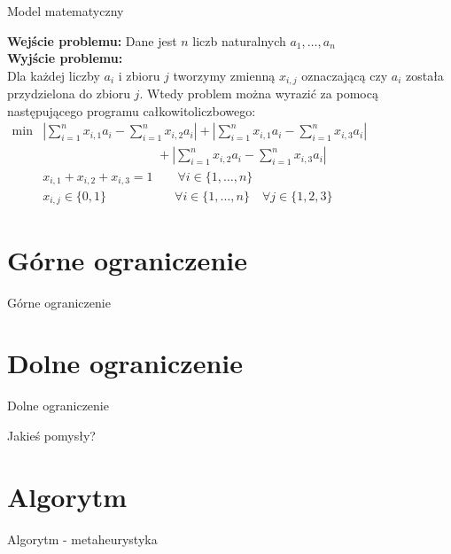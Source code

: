 \documentclass{beamer}
\begin{document}
\begin{frame}[t]{Model matematyczny}

\textbf{Wejście problemu:} Dane jest $n$ liczb naturalnych $a_1,\dots,a_n$
\\[0.1in]\textbf{Wyjście problemu:}\\ Dla każdej liczby $a_i$ i zbioru $j$ tworzymy zmienną $x_{i,j}$ oznaczającą czy $a_i$ została przydzielona do zbioru $j$. Wtedy problem można wyrazić za pomocą następującego programu całkowitoliczbowego:
\begin{equation*}
\begin{aligned}
\min &\left| \sum_{i=1}^n x_{i,1} a_i - \sum_{i=1}^n x_{i,2} a_i \right| + \left| \sum_{i=1}^n x_{i,1} a_i - \sum_{i=1}^n x_{i,3} a_i\right| \\
&\qquad\qquad\qquad\qquad\quad\:+ \left| \sum_{i=1}^n x_{i,2} a_i - \sum_{i=1}^n x_{i,3} a_i\right| \\
& x_{i,1} + x_{i,2} + x_{i,3} = 1 \quad\quad \forall i\in \{1,\dots,n\} \\
& x_{i,j} \in \{0,1\} \,\,\,\quad\qquad\qquad \forall i\in \{1,\dots,n\}\quad \forall j\in \{1,2,3\}
\end{aligned}
\phantom{\hspace{6cm}}
\end{equation*}

\end{frame}

\section{Górne ograniczenie}

\begin{frame}{Górne ograniczenie}


\end{frame}

\section{Dolne ograniczenie}

\begin{frame}{Dolne ograniczenie}

Jakieś pomysły?

\end{frame}

\section{Algorytm}

\begin{frame}{Algorytm - metaheurystyka}


\end{frame}
\end{document}
